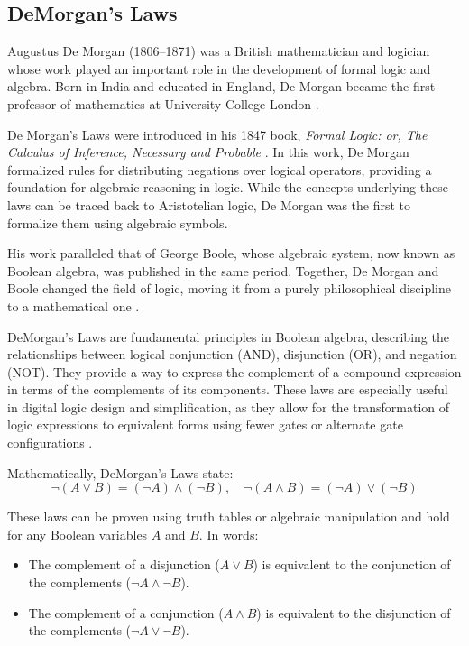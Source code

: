 \subsection{DeMorgan's Laws}
Augustus De Morgan (1806–1871) was a British mathematician and logician whose work played an important role in the development of formal logic and algebra. Born in India and educated in England, De Morgan became the first professor of mathematics at University College London \cite{grattan1997}. 

De Morgan's Laws were introduced in his 1847 book, \emph{Formal Logic: or, The Calculus of Inference, Necessary and Probable} \cite{deMorgan1847}. In this work, De Morgan formalized rules for distributing negations over logical operators, providing a foundation for algebraic reasoning in logic. While the concepts underlying these laws can be traced back to Aristotelian logic, De Morgan was the first to formalize them using algebraic symbols.

His work paralleled that of George Boole, whose algebraic system, now known as Boolean algebra, was published in the same period. Together, De Morgan and Boole changed the field of logic, moving it from a purely philosophical discipline to a mathematical one \cite{grattan1997}.

DeMorgan's Laws are fundamental principles in Boolean algebra, describing the relationships between logical conjunction (AND), disjunction (OR), and negation (NOT). They provide a way to express the complement of a compound expression in terms of the complements of its components. These laws are especially useful in digital logic design and simplification, as they allow for the transformation of logic expressions to equivalent forms using fewer gates or alternate gate configurations \cite{rosen2018, tanenbaum2013}.

Mathematically, DeMorgan's Laws state:
\[
\neg (A \lor B) = (\neg A) \land (\neg B), \quad \neg (A \land B) = (\neg A) \lor (\neg B)
\]

These laws can be proven using truth tables or algebraic manipulation and hold for any Boolean variables \( A \) and \( B \). In words:
\begin{itemize}
    \item The complement of a disjunction (\( A \lor B \)) is equivalent to the conjunction of the complements (\( \neg A \land \neg B \)).
    \item The complement of a conjunction (\( A \land B \)) is equivalent to the disjunction of the complements (\( \neg A \lor \neg B \)).
\end{itemize}

